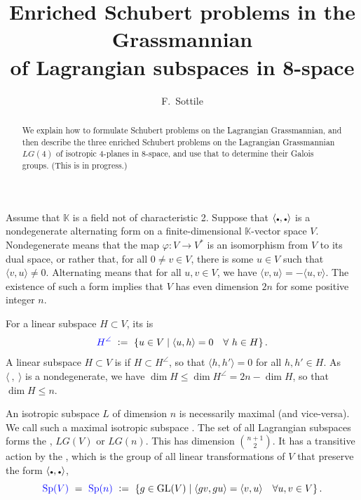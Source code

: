 \documentclass[12pt]{amsart}
\title[Enriched Schubert Problems in $\LG(4)$]{Enriched Schubert problems in the Grassmannian  \\ of Lagrangian subspaces in 8-space}
\author{F.~Sottile}
\theoremstyle{remark}
\newcommand{\GL}{\textrm{GL}}
\newcommand{\Sp}{\textrm{Sp}}
\newcommand{\LG}{\textit{LG}}
\newcommand{\KK}{{\mathbb K}}
\newcommand{\ndot}{\mbox{{\tiny$\bullet$}}}
\newcommand{\defcolor}[1]{{\color{blue}#1}}
\newcommand{\demph}[1]{\defcolor{{\sl #1}}}
\begin{document}
\begin{abstract}
  We explain how to formulate Schubert problems on the Lagrangian Grassmannian, and then
  describe the three enriched Schubert problems on the Lagrangian Grassmannian $\LG(4)$ of isotropic 4-planes in 8-space,
  and use that to determine their Galois groups. (This is in progress.)
\end{abstract}
\maketitle



Assume that $\KK$ is a field not of characteristic 2.
Suppose that $\langle\ndot,\ndot\rangle$ is a nondegenerate alternating form on a finite-dimensional $\KK$-vector space $V$.
Nondegenerate means that the map $\varphi\colon V\to V^*$ is an isomorphism from $V$ to its dual space,
or rather that, for all $0\neq v\in V$, there is some $u\in V$ such that $\langle v, u\rangle\neq 0$.
Alternating means that for all $u,v\in V$, we have $\langle v,u\rangle = - \langle u,v\rangle$.
The existence of such a form implies that $V$ has even dimension $2n$ for some positive integer $n$.

For a linear subspace $H\subset V$, its \demph{annihilator} is
\[
    \defcolor{H^\angle} \ \vcentcolon=\ \{u\in V\mid \langle u, h\rangle =0\quad\forall\ h\in H\}\,.
\]
A linear subspace $H\subset V$ is \demph{isotropic} if $H\subset H^\angle$, so that $\langle h,h'\rangle=0$
for all $h,h'\in H$.
As $\langle\:,\:\rangle$ is a nondegenerate, we have $\dim H \leq \dim H^\angle = 2n-\dim H$, so that
$\dim H\leq n$.

An isotropic subspace $L$ of dimension $n$ is necessarily maximal (and vice-versa).
We call such a maximal isotropic subspace \demph{Lagrangian}.
The set of all Lagrangian subspaces forms the \demph{Lagrangian Grassmannian}, \defcolor{$\LG(V)$} or \defcolor{$\LG(n)$}.
This has dimension $\binom{n{+}1}{2}$.
It has a transitive action by the \demph{symplectic group}, which is the group of all linear transformations of $V$ that
preserve the form $\langle\ndot,\ndot\rangle$,
\[
    \defcolor{\Sp(V)}\ =\ \defcolor{\Sp(n)}\ \vcentcolon=\
    \{ g\in \GL(V) \mid \langle gv, gu\rangle=\langle v, u\rangle\quad \forall u,v\in V\}\,.
\]
\end{document}
